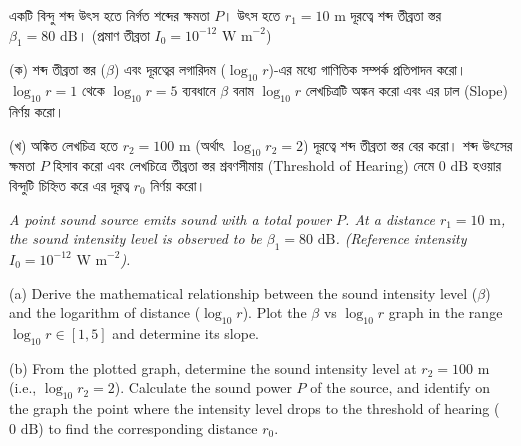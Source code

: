 \documentclass[12pt, a4paper]{article}
\begin{document}
\begin{tcolorbox}[questionbox={প্রশ্ন (Question) 7}]
\noindent
একটি বিন্দু শব্দ উৎস হতে নির্গত শব্দের ক্ষমতা $P$। উৎস হতে $r_1 = 10\text{ m}$ দূরত্বে শব্দ তীব্রতা স্তর $\beta_1 = 80\text{ dB}$। (প্রমাণ তীব্রতা $I_0 = 10^{-12}\text{ W m}^{-2}$)

\vspace{0.5em}
\noindent
(ক) শব্দ তীব্রতা স্তর ($\beta$) এবং দূরত্বের লগারিদম ($\log_{10} r$)-এর মধ্যে গাণিতিক সম্পর্ক প্রতিপাদন করো। $\log_{10} r = 1$ থেকে $\log_{10} r = 5$ ব্যবধানে $\beta$ বনাম $\log_{10} r$ লেখচিত্রটি অঙ্কন করো এবং এর ঢাল (Slope) নির্ণয় করো।

\vspace{0.3em}
\noindent
(খ) অঙ্কিত লেখচিত্র হতে $r_2 = 100\text{ m}$ (অর্থাৎ $\log_{10} r_2 = 2$) দূরত্বে শব্দ তীব্রতা স্তর বের করো। শব্দ উৎসের ক্ষমতা $P$ হিসাব করো এবং লেখচিত্রে তীব্রতা স্তর শ্রবণসীমায় (Threshold of Hearing) নেমে $0\text{ dB}$ হওয়ার বিন্দুটি চিহ্নিত করে এর দূরত্ব $r_0$ নির্ণয় করো।

\vspace{0.8em}
{\color{darkgray}\itshape
\noindent
A point sound source emits sound with a total power $P$. At a distance $r_1 = 10\text{ m}$, the sound intensity level is observed to be $\beta_1 = 80\text{ dB}$. (Reference intensity $I_0 = 10^{-12}\text{ W m}^{-2}$).

\vspace{0.3em}
\noindent
(a) Derive the mathematical relationship between the sound intensity level ($\beta$) and the logarithm of distance ($\log_{10} r$). Plot the $\beta$ vs $\log_{10} r$ graph in the range $\log_{10} r \in [1, 5]$ and determine its slope.

\vspace{0.3em}
\noindent
(b) From the plotted graph, determine the sound intensity level at $r_2 = 100\text{ m}$ (i.e., $\log_{10} r_2 = 2$). Calculate the sound power $P$ of the source, and identify on the graph the point where the intensity level drops to the threshold of hearing ($0\text{ dB}$) to find the corresponding distance $r_0$.
}
\end{tcolorbox}
\end{document}
